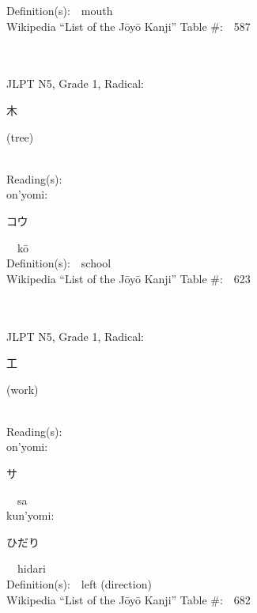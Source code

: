 \begin{multicols}{2}
Definition(s):\ \ mouth \\
Wikipedia ``List of the J\=oy\=o Kanji'' Table \#:\ \ 587 \\
\ \ \\
{\fontsize{34pt}{40pt}  }\ \ \\  %
{JLPT N5, Grade 1, Radical:\ \ {\begin{CJK}{UTF8}{min} 木 \end{CJK}} (tree) } \\
Reading(s):\ \ \\
{\hspace*{1em}}on'yomi:\ \ \\
{\hspace*{2em}}{\begin{CJK}{UTF8}{min} コウ \end{CJK}}\ \ k\=o\ \ \\
Definition(s):\ \ school \\
Wikipedia ``List of the J\=oy\=o Kanji'' Table \#:\ \ 623 \\
\ \ \\
{\fontsize{34pt}{40pt}  }\ \ \\  %
{JLPT N5, Grade 1, Radical:\ \ {\begin{CJK}{UTF8}{min} 工 \end{CJK}} (work) } \\
Reading(s):\ \ \\
{\hspace*{1em}}on'yomi:\ \ \\
{\hspace*{2em}}{\begin{CJK}{UTF8}{min} サ \end{CJK}}\ \ sa\ \ \\
{\hspace*{1em}}kun'yomi:\ \ \\
{\hspace*{2em}}{\begin{CJK}{UTF8}{min} ひだり \end{CJK}}\ \ hidari\ \ \\
Definition(s):\ \ left (direction) \\
Wikipedia ``List of the J\=oy\=o Kanji'' Table \#:\ \ 682 \\

\end{multicols}
